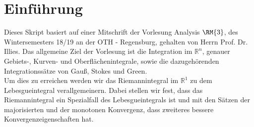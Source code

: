 \section*{Einführung}
Dieses Skript basiert auf einer Mitschrift der Vorlesung Analysis $\RM{3}$, des Wintersemesters 18/19 an der OTH - Regensburg, gehalten von Herrn Prof. Dr. Illies. Das allgemeine Ziel der Vorlesung ist die Integration im $\mathbb{R}^n$, genauer Gebiets-, Kurven- und Oberflächenintegrale, sowie die dazugehörenden Integrationssätze von Gauß, Stokes und Green.\\
Um dies zu erreichen werden wir das Riemannintegral im $\mathbb{R}^1$ zu dem Lebesgueintegral verallgemeinern. Dabei stellen wir fest, dass das Riemannintegral ein Spezialfall des Lebesgueintegrals ist und mit den Sätzen der majorisierten und der monotonen Konvergenz, dass zweiteres bessere Konvergenzeigenschaften hat.